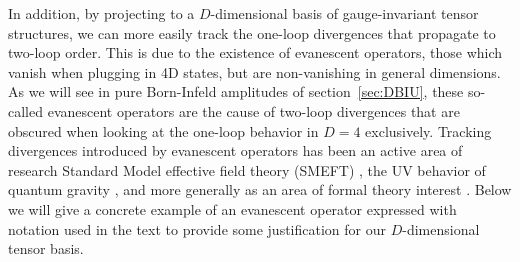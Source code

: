 \documentclass[11pt,letter]{article}
\def\sec#1{section~\ref{#1}}
\begin{document}
In addition, by projecting to a $D$-dimensional basis of gauge-invariant tensor structures, we can more easily track the one-loop divergences that propagate to two-loop order. This is due to the existence of {evanescent operators}, those which vanish when plugging in 4D states, but are non-vanishing in general dimensions. As we will see in pure Born-Infeld amplitudes of \sec{sec:DBIU}, these so-called evanescent operators are the cause of two-loop divergences that are obscured when looking at the one-loop behavior in $D=4$ exclusively. Tracking divergences introduced by evanescent operators has been an active area of research Standard Model effective field theory (SMEFT) \cite{Hartmann:2016pil,Chala:2021cgt,Aebischer:2022tvz,Fuentes-Martin:2022vvu,Isidori:2023pyp}, the UV behavior of quantum gravity \cite{Bern:2015xsa,Bern:2017tuc,Bern:2017puu}, and more generally as an area of formal theory interest \cite{Dugan:1990df,Herrlich:1994kh,Bell:2009nk,Becher:2004kk,DiPietro:2017vsp}. Below we will give a concrete example of an evanescent operator expressed with notation used in the text to provide some justification for our $D$-dimensional tensor basis. 
\end{document}
